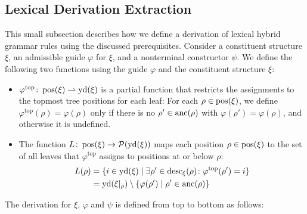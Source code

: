 \documentclass[../../document.tex]{subfiles}
\begin{document}
    \subsection{Lexical Derivation Extraction}\label{sec:extractionalg}
    This small subsection describes how we define a derivation of lexical hybrid grammar rules using the discussed prerequisites.
    Consider a constituent structure \(\xi\), an admissible guide \(\varphi\) for \(\xi\), and a nonterminal constructor \(\psi\).
    We define the following two functions using the guide \(\varphi\) and the constituent structure \(\xi\):
    \begin{itemize}
        \item
            \(\varphi^{\text{top}}\colon \operatorname{pos}(\xi) \rightharpoonup \operatorname{yd}(\xi)\) is a partial function that restricts the assignments to the topmost tree positions for each leaf:
            For each \(\rho \in \operatorname{pos}(\xi)\), we define \(\varphi^{\text{top}}(\rho) = \varphi(\rho)\) only if there is no \(\rho' \in \operatorname{anc}(\rho)\) with \(\varphi(\rho') = \varphi(\rho)\), and otherwise it is undefined.
        \item
            The function \(L\colon \operatorname{pos}(\xi) \to \mathcal{P}(\operatorname{yd}(\xi))\) maps each position \(\rho\in \operatorname{pos}(\xi)\) to the set of all leaves that \(\varphi^{\text{top}}\) assigns to positions at or below \(\rho\):
                \begin{align*}
                    L(\rho) &= \{ i \in \operatorname{yd}(\xi) \mid \exists \rho' \in \operatorname{desc}_\xi(\rho)\colon \varphi^{\text{top}}(\rho') = i \} \\
                            &= \operatorname{yd}(\xi|_\rho) \setminus \{ \varphi(\rho') \mid \rho' \in \operatorname{anc}(\rho) \}
                \end{align*}
    \end{itemize}
    The derivation for \(\xi\), \(\varphi\) and \(\psi\) is defined from top to bottom as follows:
\end{document}
